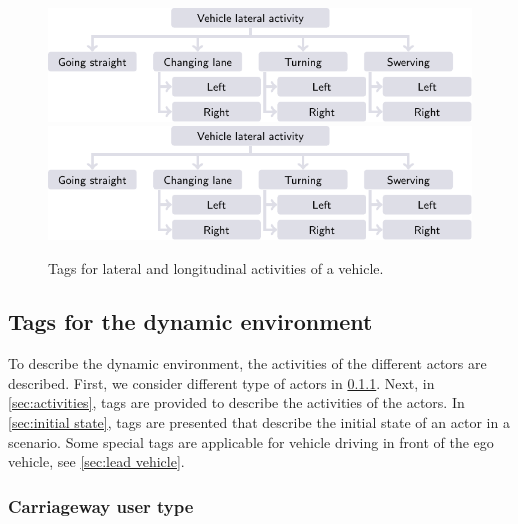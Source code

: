 \begin{figure}[t!]
	\centering
	\includegraphics{figures/lat_activity}\\
	\vspace{0.5em}
	\includegraphics{figures/lat_activity}
	\caption{Tags for lateral and longitudinal activities of a vehicle. 
	}
	\label{fig:activities}
\end{figure}


\subsection{Tags for the dynamic environment}
\label{sec:selection of tags dynamic}

To describe the dynamic environment, the activities of the different actors are described. First, we consider different type of actors in \cref{sec:type of actor}. Next, in \cref{sec:activities}, tags are provided to describe the activities of the actors. In \cref{sec:initial state}, tags are presented that describe the initial state of an actor in a scenario. Some special tags are applicable for vehicle driving in front of the ego vehicle, see \cref{sec:lead vehicle}. %



\subsubsection{Carriageway user type}
\label{sec:type of actor}

